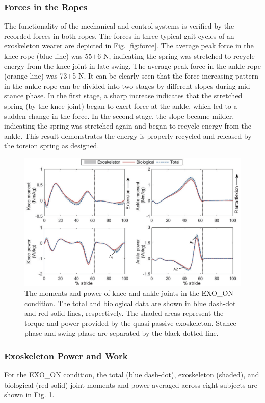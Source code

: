 \documentclass[twocolumn,cleanfoot,10pt]{asme2ej}
\begin{document}
\subsubsection{Forces in the Ropes}
The functionality of the mechanical and control systems is verified by the recorded forces in both ropes.
The forces in three typical gait cycles of an exoskeleton wearer are depicted in Fig. \ref{fig:force}.
The average peak force in the knee rope (blue line) was 55$\pm$6 N, indicating the spring was stretched to recycle energy from the knee joint in late swing.
The average peak force in the ankle rope (orange line) was 73$\pm$5 N.
It can be clearly seen that the force increasing pattern in the ankle rope can be divided into two stages by different slopes during mid-stance phase.
In the first stage, a sharp increase indicates that the stretched spring (by the knee joint) began to exert force at the ankle, which led to a sudden change in the force.
In the second stage, the slope became milder, indicating the spring was stretched again and began to recycle energy from the ankle.
This result demonstrates the energy is properly recycled and released by the torsion spring as designed.

\begin{figure}[t]
	\centering
	\includegraphics[width=17cm]{exo.eps}
	\caption{The moments and power of knee and ankle joints in the EXO\_ON condition.
	The total and biological data are shown in blue dash-dot and red solid lines, respectively.
	The shaded areas represent the torque and power provided by the quasi-passive exoskeleton.
	Stance phase and swing phase are separated by the black dotted line.}
	\label{fig:exo}
\end{figure}

\subsubsection{Exoskeleton Power and Work}
For the EXO\_ON condition, the total (blue dash-dot), exoskeleton (shaded), and biological (red solid) joint moments and power averaged across eight subjects are shown in Fig. \ref{fig:exo}.
\end{document}
